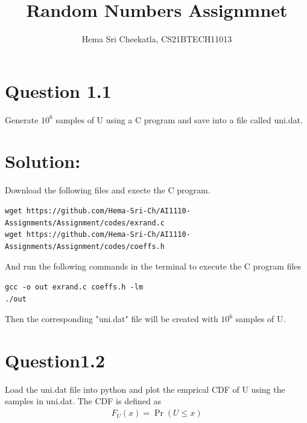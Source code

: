 \documentclass[16pt, a4paper, two column]{article}
\title{Random Numbers Assignmnet}
\author{Hema Sri Cheekatla, CS21BTECH11013}
\providecommand{\pr}[1]{\ensuremath{\Pr\left(#1\right)}}
\begin{document}
\maketitle
\section*{Question 1.1}Generate $10^6$ samples of U using a C program and save into a file called uni.dat.
\section*{Solution:}
Download the following files and execte the C program.
\begin{lstlisting}
wget https://github.com/Hema-Sri-Ch/AI1110-Assignments/Assignment/codes/exrand.c
wget https://github.com/Hema-Sri-Ch/AI1110-Assignments/Assignment/codes/coeffs.h
\end{lstlisting}
And run the following commands in the terminal to execute the C program files
\begin{lstlisting}
gcc -o out exrand.c coeffs.h -lm
./out
\end{lstlisting}
Then the corresponding "uni.dat" file will be created with $10^6$ samples of U.

\section*{Question1.2}
Load the uni.dat file into python and plot the emprical CDF of U using the samples in uni.dat. The CDF is defined as 
\begin{align}
	F_U(x) = \pr{U \leq x}
\end{align}
\end{document}
